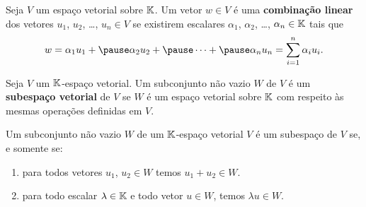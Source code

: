 \documentclass{beamer}
\begin{document}
\begin{frame}
	\begin{definicao}
		Seja $V$ um espa\c{c}o vetorial sobre $\mathbb{K}$.\pause
		Um vetor $w \in V$ \'e uma \textbf{combina\c{c}\~ao linear} \pause dos vetores $u_1$, \pause $u_2$, \pause \dots,
		$u_n \in V$ \pause se existirem escalares $\alpha_1$, \pause $\alpha_2$, \pause \dots, \pause $\alpha_n \in \mathbb{K}$ tais que\pause
		\[
			w = \alpha_1 u_1 + \pause \alpha_2u_2 + \pause \cdots + \pause \alpha_nu_n = \sum_{i = 1}^n \alpha_iu_i.
		\]
	\end{definicao}
\end{frame}

\begin{frame}
	\begin{definicao}
		Seja $V$ um $\mathbb{K}$-espa\c{c}o vetorial. \pause Um subconjunto n\~ao vazio $W$ \pause de $V$ \'e um \textbf{subespa\c{c}o vetorial} de $V$ \pause se $W$ é um espaço vetorial
		sobre $\mathbb{K}$ \pause com respeito às mesmas operações definidas em $V$.\pause
	\end{definicao}

	\begin{teorema}
		Um subconjunto n\~ao vazio $W$ \pause de um $\mathbb{K}$-espa\c{c}o vetorial $V$ \pause \'e um subespa\c{c}o de $V$ \pause se, e somente se:
		\begin{enumerate}[label={\roman*})]
			\item para todos vetores $u_1$, $u_2 \in W$ \pause temos $u_1 + u_2 \in W$.\pause
			\item para todo escalar $\lambda \in \mathbb{K}$ \pause e todo vetor $u \in W$, \pause temos $\lambda u\in W$.
		\end{enumerate}
	\end{teorema}
\end{frame}
\end{document}
